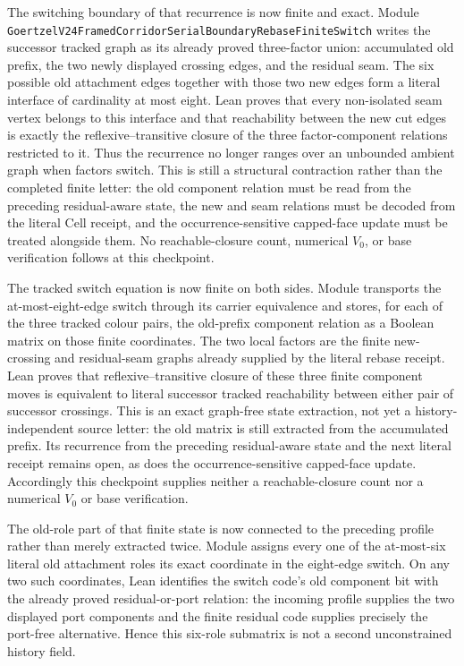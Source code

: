 \documentclass[11pt]{article}
\theoremstyle{definition}
\begin{document}
The switching boundary of that recurrence is now finite and exact.  Module
\texttt{GoertzelV24FramedCorridorSerialBoundaryRebaseFiniteSwitch} writes the
successor tracked graph as its already proved three-factor union: accumulated
old prefix, the two newly displayed crossing edges, and the residual seam.
The six possible old attachment edges together with those two new edges form
a literal interface of cardinality at most eight.  Lean proves that every
non-isolated seam vertex belongs to this interface and that reachability
between the new cut edges is exactly the reflexive--transitive closure of the
three factor-component relations restricted to it.  Thus the recurrence no
longer ranges over an unbounded ambient graph when factors switch.  This is
still a structural contraction rather than the completed finite letter: the
old component relation must be read from the preceding residual-aware state,
the new and seam relations must be decoded from the literal Cell receipt, and
the occurrence-sensitive capped-face update must be treated alongside them.
No reachable-closure count, numerical $V_0$, or base verification follows at
this checkpoint.

The tracked switch equation is now finite on both sides.  Module
transports the at-most-eight-edge switch through its carrier equivalence and
stores, for each of the three tracked colour pairs, the old-prefix component
relation as a Boolean matrix on those finite coordinates.  The two local
factors are the finite new-crossing and residual-seam graphs already supplied
by the literal rebase receipt.  Lean proves that reflexive--transitive closure
of these three finite component moves is equivalent to literal successor
tracked reachability between either pair of successor crossings.  This is an
exact graph-free state extraction, not yet a history-independent source
letter: the old matrix is still extracted from the accumulated prefix.  Its
recurrence from the preceding residual-aware state and the next literal
receipt remains open, as does the occurrence-sensitive capped-face update.
Accordingly this checkpoint supplies neither a reachable-closure count nor a
numerical $V_0$ or base verification.

The old-role part of that finite state is now connected to the preceding
profile rather than merely extracted twice.  Module
assigns every one of the at-most-six literal old attachment roles its exact
coordinate in the eight-edge switch.  On any two such coordinates, Lean
identifies the switch code's old component bit with the already proved
residual-or-port relation: the incoming profile supplies the two displayed
port components and the finite residual code supplies precisely the
port-free alternative.  Hence this six-role submatrix is not a second
unconstrained history field.
\end{document}
